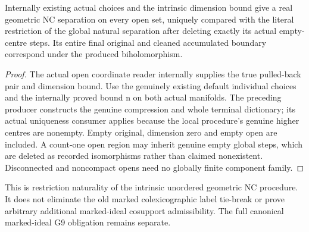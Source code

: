 \begin{theorem}
\label{hir:general-nc-open-internally-natural-separation}
\leanok
Internally existing actual choices and the intrinsic dimension bound give a
real geometric NC separation on every open set, uniquely compared with the
literal restriction of the global natural separation after deleting exactly
its actual empty-centre steps. Its entire final original and cleaned accumulated
boundary correspond under the produced biholomorphism.
\end{theorem}
\begin{proof}
The actual open coordinate reader internally supplies the true pulled-back
pair and dimension bound. Use the genuinely existing default individual choices
and the internally proved bound n on both actual manifolds. The preceding
producer constructs the genuine compression and whole terminal dictionary;
its actual uniqueness consumer applies because the local procedure's genuine
higher centres are nonempty. Empty original, dimension zero and empty open
are included. A count-one open region may inherit genuine empty global steps,
which are deleted as recorded isomorphisms rather than claimed nonexistent.
Disconnected and noncompact opens need no globally finite component family.
\end{proof}

\begin{remark}
This is restriction naturality of the intrinsic unordered geometric NC
procedure. It does not eliminate the old marked colexicographic label tie-break
or prove arbitrary additional marked-ideal cosupport admissibility. The full
canonical marked-ideal G9 obligation remains separate.
\end{remark}
